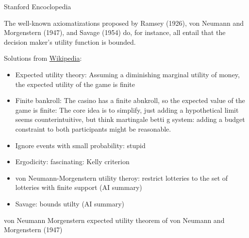 Stanford Encoclopedia

The well-known axiomatizations proposed by Ramsey (1926), von Neumann and Morgenstern (1947), and Savage (1954) do, for instance, all entail that the decision maker’s utility function is bounded.

Solutions from \href{https://en.wikipedia.org/wiki/St._Petersburg_paradox#cite_note-Peters2011a-28}{Wikipedia}:
\begin{itemize}
    \item Expected utility theory: Assuming a diminishing marginal utility of money, the expected utility of the game is finite
    \item Finite bankroll: The casino has a finite abnkroll, so the expected value of the game is finite: The core idea is to simplify, just adding a hypothetical limit seems counterintuitive, but think martingale betti g system: adding a budget constraint to both participants might be reasonable.
    \item Ignore events with small probability: stupid
    \item Ergodicity: fascinating: Kelly criterion
    \item von Neumann-Morgenstern utility theroy: restrict lotteries to the set of lotteries with finite support (AI summary)
    \item Savage: bounds utilty (AI summary)
\end{itemize}



von Neumann Morgenstern expected utility theorem of von Neumann and Morgenstern (1947)


